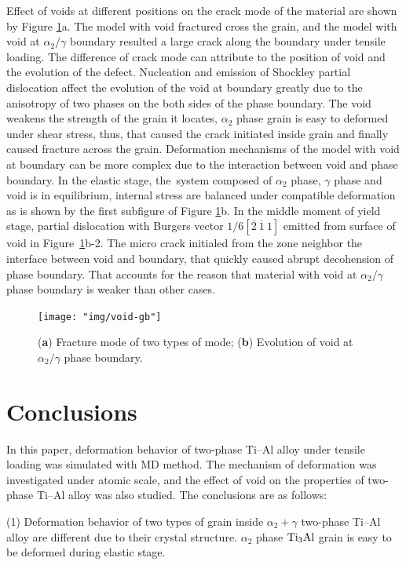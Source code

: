 \documentclass[materials,article,accept,moreauthors,pdftex,10pt,a4paper]{Definitions/mdpi}
\begin{document}
Effect of voids at different positions on the crack mode of the material are shown by Figure \ref{fig:void-gb}a. The model with void fractured cross the grain, and the model with void at $\alpha_2 / \gamma$ boundary resulted a large crack along the boundary under tensile loading. The difference of crack mode can attribute to the position of void and the evolution of the defect. Nucleation and emission of Shockley partial dislocation affect the evolution of the void at boundary greatly due to the anisotropy of two phases on the both sides of the phase boundary. The void weakens the strength of the grain it locates,  $\alpha_2$ phase grain is easy to deformed under shear stress, thus, that caused the crack initiated inside grain and finally caused fracture across the grain. Deformation mechanisms of the model with void at boundary can be  more complex due to the interaction between void and phase boundary. In the elastic stage, the~system composed of $\alpha_2$ phase, $\gamma$ phase and void is in equilibrium, internal stress are balanced under compatible deformation as is shown by the first subfigure of Figure \ref{fig:void-gb}b. In the middle moment of yield stage, partial dislocation with Burgers vector $1/6[\overline{2}\ \overline{1}\ 1]$ emitted from surface of void in Figure~\ref{fig:void-gb}b-2. The micro crack initialed from the zone neighbor  the interface between void and boundary, that quickly caused abrupt decohension of phase boundary. That accounts for the reason that material with void at $\alpha_2 / \gamma$ phase boundary is weaker than other cases.


\begin{figure}[H]
\centering
\texttt{[image: "img/void-gb"]}
\caption{(\textbf{a}) Fracture mode of two types of mode;  (\textbf{b}) Evolution of void at $\alpha_2 / \gamma$ phase boundary.}
\label{fig:void-gb}
\end{figure}


\section{Conclusions}

In this paper, deformation behavior of two-phase Ti--Al alloy under tensile loading was simulated with MD method. The mechanism of deformation was investigated under atomic scale, and the effect of void on the properties of two-phase Ti--Al alloy was also studied.  The conclusions are as follows:

(1) Deformation behavior of two types of grain inside $\alpha_2+\gamma$ two-phase Ti--Al alloy are different due to their crystal structure. $\alpha_2$ phase $\rm{Ti_3Al}$ grain is easy to be deformed during elastic stage.
\end{document}
